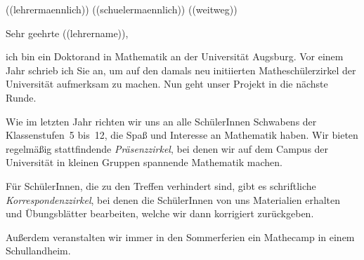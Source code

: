 \documentclass{../zirkelbrief}
\begin{document}
\renewcommand{\anschrift}{%
      ((schule)) \\
      ((lehrername)) \\
      ((strasse)) \\
      ((plz)) ((ort))}
\renewcommand{\datum}{\today}
\renewcommand{\betreff}{Matheschülerzirkel der Universität Augsburg}
\renewcommand{\absender}{%
      \textbf{Ingo Blechschmidt} \\
      \ \\
      Lehrstuhl für Algebra und Zahlentheorie \\
      Universitätsstr. 14 \\
      86159 Augsburg \\
      \ \\
      Telefon \> +49 (0) 821 598 -- 5601 \\
      Telefax \> +49 (0) 821 598 -- 2090 \\
      \textsf{blechschmidt@math.uni-augsburg.de} \\}

\makeletterhead

\newif\iflehrermaennlich\lehrermaennlich((lehrermaennlich))
\newif\ifschuelermaennlich\schuelermaennlich((schuelermaennlich))
\newif\ifweitweg\weitweg((weitweg))

\iflehrermaennlich
Sehr geehrter ((lehrername)),
\else
Sehr geehrte ((lehrername)),
\fi

ich bin ein Doktorand in Mathematik an der Universität Augsburg. Vor einem Jahr
schrieb ich Sie an, um auf den damals neu initiierten Matheschülerzirkel der
Universität aufmerksam zu machen. Nun geht unser Projekt in die nächste Runde.

Wie im letzten Jahr richten wir uns an alle SchülerInnen Schwabens der
Klassenstufen~5 bis~12, die Spaß und Interesse an Mathematik haben. Wir bieten
regelmäßig stattfindende \emph{Präsenzzirkel}, bei denen wir auf dem Campus der
Universität in kleinen Gruppen spannende Mathematik machen.
\ifweitweg
Für weiter entfernt wohnende SchülerInnen gibt es schriftliche
\emph{Korrespondenzzirkel}, bei denen die SchülerInnen von uns Materialien
erhalten und Übungsblätter bearbeiten, welche wir dann korrigiert zurückgeben.
\else
Für SchülerInnen, die zu den Treffen verhindert sind, gibt es
schriftliche \emph{Korrespondenzzirkel}, bei denen die SchülerInnen von uns Materialien
erhalten und Übungsblätter bearbeiten, welche wir dann korrigiert zurückgeben.
\fi
Außerdem veranstalten wir immer in den Sommerferien ein Mathecamp in einem
Schullandheim.
\ifweitweg
Im letzten Schuljahr stammten etwa 130 unserer TeilnehmerInnen nicht aus dem
Großraum Augsburg.
\fi
\end{document}
